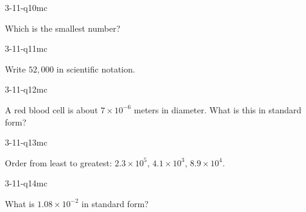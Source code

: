 \begin{practiceQuestion}{3-11-q10}{mc}
\begin{questionText}
Which is the smallest number?
\end{questionText}
\end{practiceQuestion}

\begin{practiceQuestion}{3-11-q11}{mc}
\begin{questionText}
Write $52{,}000$ in scientific notation.
\end{questionText}
\end{practiceQuestion}

\begin{practiceQuestion}{3-11-q12}{mc}
\begin{questionText}
A red blood cell is about $7 \times 10^{-6}$ meters in diameter. What is this in standard form?
\end{questionText}
\end{practiceQuestion}

\begin{practiceQuestion}{3-11-q13}{mc}
\begin{questionText}
Order from least to greatest: $2.3 \times 10^5$, $4.1 \times 10^3$, $8.9 \times 10^4$.
\end{questionText}
\end{practiceQuestion}

\begin{practiceQuestion}{3-11-q14}{mc}
\begin{questionText}
What is $1.08 \times 10^{-2}$ in standard form?
\end{questionText}
\end{practiceQuestion}

